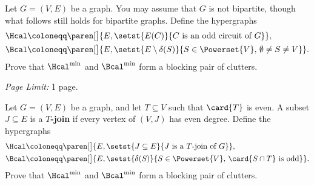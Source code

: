\documentclass[11pt,leqno,final]{amsart}
\begin{document}
\begin{exercise}
  \label{ex:odd-circuit-blocker}
  Let \(G = (V,E)\) be a graph.
  You may assume that \(G\) is not bipartite, though what follows
  still holds for bipartite graphs.
  Define the hypergraphs
  \begin{align*}
    \Hcal
    & \coloneqq
    \paren[\big]{
      E,
      \setst{E(C)}{C \text{ is an odd circuit of~\(G\)}}
    },
    \\
    \Bcal
    & \coloneqq
    \paren[\big]{
      E,
      \setst{E \setminus \delta(S)}{S \in \Powerset{V},\, \emptyset \neq S \neq V}
    }.
  \end{align*}
  Prove that \(\Hcal^{\min}\) and \(\Bcal^{\min}\) form a blocking
  pair of clutters.

  \smallskip
  \noindent\small
  \textit{Page Limit:} 1 page.
\end{exercise}

\begin{exercise}
  \label{ex:Tjoin-blocker}
  Let \(G = (V,E)\) be a graph, and let \(T \subseteq V\) such that
  \(\card{T}\) is even.
  A subset \(J \subseteq E\) is a \textbf{\(T\)-join} if every vertex
  of \((V,J)\) has even degree.
  Define the hypergraphs
  \begin{align*}
    \Hcal
    & \coloneqq
    \paren[\big]{
      E,
      \setst{J \subseteq E}{J \text{ is a \(T\)-join of~\(G\)}}
    },
    \\
    \Bcal
    & \coloneqq
    \paren[\big]{
      E,
      \setst{\delta(S)}{S \in \Powerset{V},\, \card{S \cap T} \text{
      is odd}}
    }.
  \end{align*}
  Prove that \(\Hcal^{\min}\) and \(\Bcal^{\min}\) form a blocking
  pair of clutters.
\end{exercise}
\end{document}
